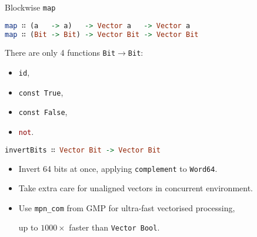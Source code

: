 \documentclass[handout]{beamer}
\begin{document}
\begin{frame}[fragile]{Blockwise {\tt map}}

\begin{lstlisting}[language=Haskell]
map ∷ (a   -> a)   -> Vector a   -> Vector a
map ∷ (Bit -> Bit) -> Vector Bit -> Vector Bit
\end{lstlisting}

\pause
\bigskip

There are only 4 functions {\tt Bit}${}\to{}${\tt Bit}:
\begin{itemize}
\item {\tt id},
\item {\tt const True},
\item {\tt const False},
\item \textcolor{darkred}{\tt not}.
\end{itemize}

\pause

\begin{lstlisting}[language=Haskell]
invertBits ∷ Vector Bit -> Vector Bit
\end{lstlisting}

\pause

\begin{itemize}[<+->]
\item Invert 64 bits at once, applying {\tt complement} to {\tt Word64}.
\item Take extra care for unaligned vectors in concurrent environment.
\item Use {\tt mpn\_com} from GMP for ultra-fast vectorised processing, \par
      up to $1000\times$ faster than {\tt Vector Bool}.
\end{itemize}

\end{frame}
\end{document}
